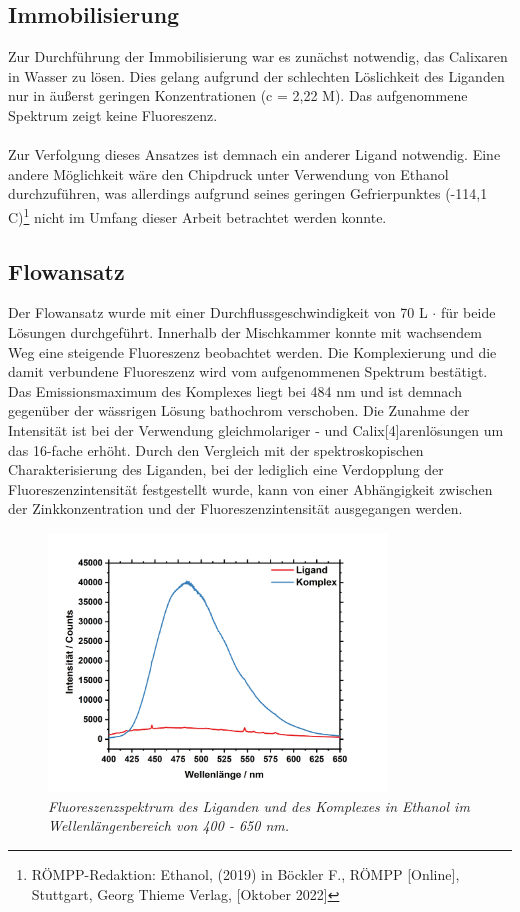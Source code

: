 \documentclass[12pt,a4paper]{report}
\begin{document}
	\subsection{Immobilisierung}
	Zur Durchführung der Immobilisierung war es zunächst notwendig, das Calixaren in Wasser zu lösen. Dies gelang aufgrund der schlechten Löslichkeit des Liganden nur in äußerst geringen Konzentrationen (c = 2,22  M). Das aufgenommene Spektrum zeigt keine Fluoreszenz.\\
	\ \\
	Zur Verfolgung dieses Ansatzes ist demnach ein anderer Ligand notwendig. Eine andere Möglichkeit wäre den Chipdruck unter Verwendung von Ethanol durchzuführen, was allerdings aufgrund seines geringen Gefrierpunktes (-114,1 \textdegree C)\footnote{RÖMPP-Redaktion: Ethanol, (2019) in Böckler F., RÖMPP [Online], Stuttgart, Georg Thieme Verlag, [Oktober 2022]} nicht im Umfang dieser Arbeit betrachtet werden konnte. 
	\newpage 
	\subsection{Flowansatz}
	Der Flowansatz wurde mit einer Durchflussgeschwindigkeit von 70 \textmu L $\cdot$  für beide Lösungen durchgeführt. Innerhalb der Mischkammer konnte mit wachsendem Weg eine steigende Fluoreszenz beobachtet werden. Die Komplexierung und die damit verbundene Fluoreszenz wird vom aufgenommenen Spektrum bestätigt. Das Emissionsmaximum des Komplexes liegt bei 484 nm und ist demnach gegenüber der wässrigen Lösung bathochrom verschoben. Die Zunahme der Intensität ist bei der Verwendung gleichmolariger - und Calix[4]arenlösungen um das 16-fache erhöht. Durch den  Vergleich mit der spektroskopischen Charakterisierung des Liganden, bei der lediglich eine Verdopplung der Fluoreszenzintensität festgestellt wurde, kann von einer Abhängigkeit zwischen der Zinkkonzentration und der Fluoreszenzintensität ausgegangen werden. 
		\begin{figure}[h!]
			\centering 
			\includegraphics[width=0.8\textwidth]{FlowLigandKomplex.jpg}
			\caption{\textnormal{\textit{Fluoreszenzspektrum des Liganden und des Komplexes in Ethanol im Wellenlängenbereich von 400 - 650 nm.}}}
			\label{fig:FlowLigandKomplex}
		\end{figure}
\end{document}
